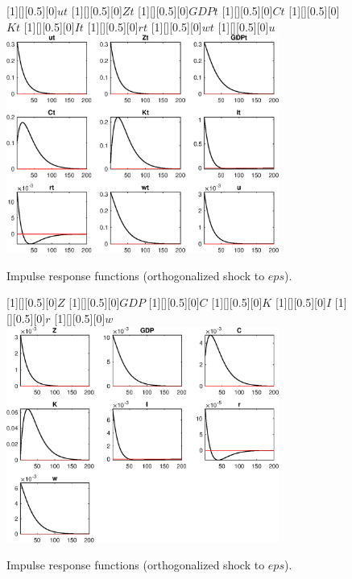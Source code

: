  
\begin{figure}[H]
[1][][0.5][0]{$ut$}
[1][][0.5][0]{$Zt$}
[1][][0.5][0]{$GDPt$}
[1][][0.5][0]{$Ct$}
[1][][0.5][0]{$Kt$}
[1][][0.5][0]{$It$}
[1][][0.5][0]{$rt$}
[1][][0.5][0]{$wt$}
[1][][0.5][0]{$u$}
\centering 
\includegraphics[width=0.80\textwidth]{DyTruncation/graphs/DyTruncation_IRF_eps1}
\caption{Impulse response functions (orthogonalized shock to $eps$).}\label{Fig:IRF:eps:1}
\end{figure}
 
\begin{figure}[H]
[1][][0.5][0]{$Z$}
[1][][0.5][0]{$GDP$}
[1][][0.5][0]{$C$}
[1][][0.5][0]{$K$}
[1][][0.5][0]{$I$}
[1][][0.5][0]{$r$}
[1][][0.5][0]{$w$}
\centering 
\includegraphics[width=0.80\textwidth]{DyTruncation/graphs/DyTruncation_IRF_eps2}
\caption{Impulse response functions (orthogonalized shock to $eps$).}\label{Fig:IRF:eps:2}
\end{figure}
 
 
